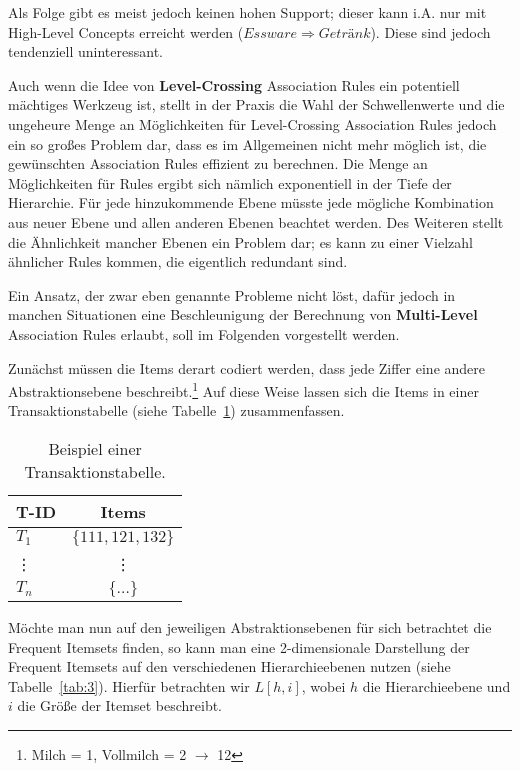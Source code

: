 Als Folge gibt es meist jedoch keinen hohen Support; dieser kann i.A. nur mit
High-Level Concepts erreicht werden (\(Essware \Rightarrow Getränk\)).
Diese sind jedoch tendenziell uninteressant.

Auch wenn die Idee von \textbf{Level-Crossing} Association Rules ein potentiell mächtiges
Werkzeug ist, stellt
in der Praxis die Wahl der Schwellenwerte und die ungeheure Menge an
Möglichkeiten für Level-Crossing Association Rules jedoch ein so großes Problem
dar, dass es im Allgemeinen nicht mehr möglich ist, die gewünschten Association Rules
effizient zu berechnen. Die Menge an Möglichkeiten für Rules ergibt sich nämlich
exponentiell in der Tiefe der Hierarchie. Für jede hinzukommende Ebene müsste jede
mögliche Kombination aus neuer Ebene und allen anderen Ebenen beachtet werden.
Des Weiteren stellt die Ähnlichkeit mancher Ebenen ein Problem dar; es kann zu einer
Vielzahl ähnlicher Rules kommen, die eigentlich redundant sind.

Ein Ansatz, der zwar eben genannte Probleme nicht löst, dafür jedoch in manchen
Situationen eine Beschleunigung der Berechnung von \textbf{Multi-Level} Association
Rules erlaubt, soll im Folgenden vorgestellt werden.

Zunächst müssen die Items derart codiert werden, dass jede Ziffer eine andere
Abstraktionsebene beschreibt.\footnote{Milch = 1, Vollmilch = 2 \(\longrightarrow\) 12}
Auf diese Weise lassen sich die Items in einer Transaktionstabelle (siehe 
Tabelle~\ref{tab:transaction}) zusammenfassen.

\begin{table}[tbh]
	\centering
	\caption{Beispiel einer Transaktionstabelle.}
	\label{tab:transaction}
	\begin{tabular}{lc}
		\toprule
		\textbf{T-ID} & \textbf{Items}\\
		\midrule
		\(T_1\)	& \(\{111, 121, 132\}\)\\
		\vdots 	& \vdots\\
		\(T_n\)	& \(\{\dots\}\)\\
		\bottomrule
	\end{tabular}
\end{table}

Möchte man nun auf den jeweiligen Abstraktionsebenen für sich betrachtet die
Frequent Itemsets finden, so kann man eine 2-dimensionale Darstellung der Frequent Itemsets
auf den verschiedenen Hierarchieebenen
nutzen (siehe Tabelle~\ref{tab:3}). Hierfür betrachten wir \(L[h,i]\), wobei 
\(h\) die Hierarchieebene und \(i\) die Größe der Itemset  beschreibt.

